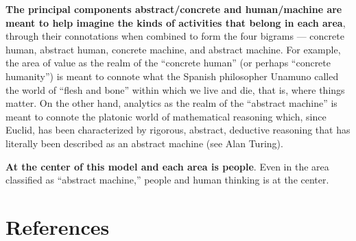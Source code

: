 \documentclass[
  letterpaper,
]{report}
\begin{document}
\textbf{The principal components abstract/concrete and human/machine are
meant to help imagine the kinds of activities that belong in each area},
through their connotations when combined to form the four bigrams ---
concrete human, abstract human, concrete machine, and abstract machine.
For example, the area of value as the realm of the ``concrete human''
(or perhaps ``concrete humanity'') is meant to connote what the Spanish
philosopher Unamuno called the world of ``flesh and bone'' within which
we live and die, that is, where things matter. On the other hand,
analytics as the realm of the ``abstract machine'' is meant to connote
the platonic world of mathematical reasoning which, since Euclid, has
been characterized by rigorous, abstract, deductive reasoning that has
literally been described as an abstract machine (see Alan Turing).

\textbf{At the center of this model and each area is people}. Even in
the area classified as ``abstract machine,'' people and human thinking
is at the center.


\hypertarget{references}{%
\chapter*{References}\label{references}}

\end{document}
